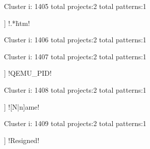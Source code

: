 Cluster i: 1405
total projects:2
total patterns:1
\begin{multicols}{1}
\begin{description}[noitemsep,topsep=0pt]
\item [[2] ] \cverb!.*\.htm!
\end{description}
\end{multicols}







Cluster i: 1406
total projects:2
total patterns:1
\begin{multicols}{1}
\begin{description}[noitemsep,topsep=0pt]
\item [[2] ] \cverb!:[0-9]*$!
\end{description}
\end{multicols}







Cluster i: 1407
total projects:2
total patterns:1
\begin{multicols}{1}
\begin{description}[noitemsep,topsep=0pt]
\item [[2] ] \cverb!QEMU_PID!
\end{description}
\end{multicols}







Cluster i: 1408
total projects:2
total patterns:1
\begin{multicols}{1}
\begin{description}[noitemsep,topsep=0pt]
\item [[2] ] \cverb![N|n]ame!
\end{description}
\end{multicols}







Cluster i: 1409
total projects:2
total patterns:1
\begin{multicols}{1}
\begin{description}[noitemsep,topsep=0pt]
\item [[2] ] \cverb!Resigned!
\end{description}
\end{multicols}







